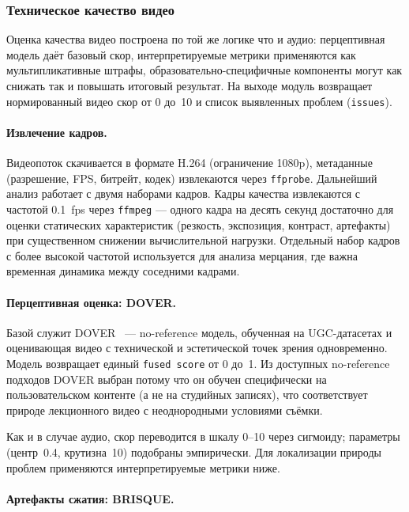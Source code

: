 \subsubsection{Техническое качество видео}
\label{sec:method-video}

Оценка качества видео построена по той же логике что и аудио:
перцептивная модель даёт базовый скор, интерпретируемые метрики
применяются как мультипликативные штрафы, образовательно-специфичные
компоненты могут как снижать так и повышать итоговый результат.
На выходе модуль возвращает нормированный видео скор от 0 до~10
и список выявленных проблем (\texttt{issues}).

\paragraph{Извлечение кадров.}

Видеопоток скачивается в формате H.264 (ограничение 1080p),
метаданные (разрешение, FPS, битрейт, кодек) извлекаются через \texttt{ffprobe}.
Дальнейший анализ работает с двумя наборами кадров.
Кадры качества извлекаются с частотой 0.1~fps через \texttt{ffmpeg} —
одного кадра на десять секунд достаточно для оценки статических характеристик
(резкость, экспозиция, контраст, артефакты) при существенном снижении вычислительной нагрузки.
Отдельный набор кадров с более высокой частотой используется для анализа мерцания,
где важна временная динамика между соседними кадрами.

\paragraph{Перцептивная оценка: DOVER.}

Базой служит DOVER~\cite{wu2023vqa} — no-reference модель,
обученная на UGC-датасетах и оценивающая видео с технической и эстетической
точек зрения одновременно. Модель возвращает единый \texttt{fused score} от 0 до~1.
Из доступных no-reference подходов DOVER выбран потому что он обучен
специфически на пользовательском контенте (а не на студийных записях),
что соответствует природе лекционного видео с неоднородными условиями съёмки.

Как и в случае аудио, скор переводится в шкалу 0–10 через сигмоиду;
параметры (центр~0.4, крутизна~10) подобраны эмпирически.
Для локализации природы проблем применяются интерпретируемые метрики ниже.

\paragraph{Артефакты сжатия: BRISQUE.}


